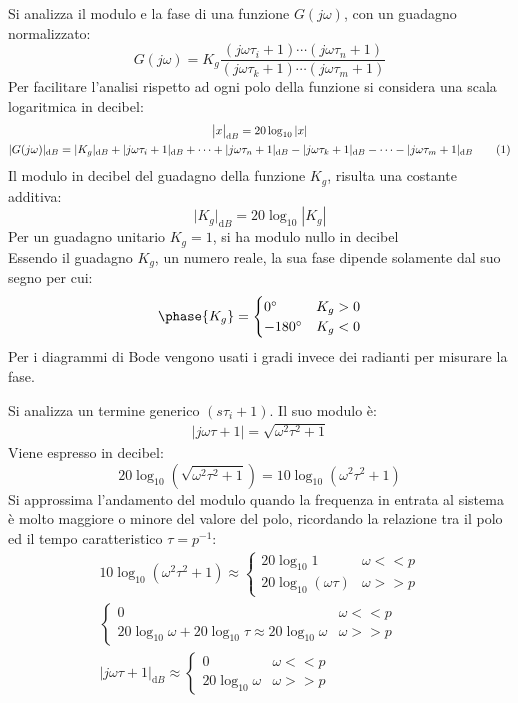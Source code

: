 \documentclass{article}
\numberwithin{equation}{subsection}
\newcommand{\df}{\mathrm{d}}
\newcommand{\tageq}{\tag{\stepcounter{equation}\theequation}}
\begin{document}
Si analizza il modulo e la fase di una funzione $G(j\omega)$, con un guadagno normalizzato:
\begin{equation*}
    G(j\omega)=K_g\displaystyle\frac{(j\omega\tau_i+1)\cdots(j\omega\tau_n+1)}{(j\omega\tau_k+1)\cdots(j\omega\tau_m+1)}
\end{equation*}
Per facilitare l'analisi rispetto ad ogni polo della funzione si considera una scala logaritmica in decibel:
\begin{gather*}
    \big|x\big|_{\df B}=20\log_{10}|x|\\
    |G(j\omega)|_{\df B}=|K_g|_{\df B}+|j\omega\tau_i+1|_{\df B}+\cdots+|j\omega\tau_n+1|_{\df B}-|j\omega\tau_k+1|_{\df B}-\cdots-|j\omega\tau_m+1|_{\df B}\tageq
\end{gather*}
Il modulo in decibel del guadagno della funzione $K_g$, risulta una costante additiva:
\begin{equation}
    \big|K_g\big|_{\df B}=20\log_{10}|K_g|
\end{equation}
Per un guadagno unitario $K_g=1$, si ha modulo nullo in decibel
\\
Essendo il guadagno $K_g$, un numero reale, la sua fase dipende solamente dal suo segno per cui: 
\begin{equation}
    \phase{K_g}=
    \begin{cases}
        0^\circ&K_g>0\\
        -180^\circ&K_g<0
    \end{cases}
\end{equation}
Per i diagrammi di Bode vengono usati i gradi invece dei radianti per misurare la fase. 

Si analizza un termine generico $(s\tau_i+1)$. Il suo modulo è:
\begin{gather*}
    |j\omega\tau+1|=\sqrt{\omega^2\tau^2+1}
\end{gather*}
Viene espresso in decibel:
\begin{equation*}
    20\log_{10}\left(\sqrt{\omega^2\tau^2+1}\right)=10\log_{10}(\omega^2\tau^2+1)
\end{equation*}
Si approssima l'andamento del modulo quando la frequenza in entrata al sistema è molto maggiore o minore del valore del polo, ricordando la relazione tra il polo ed il tempo 
caratteristico $\tau=p^{-1}$:
\begin{gather*}
    10\log_{10}(\omega^2\tau^2+1)\approx
    \begin{cases}
        20\log_{10}1&\omega<<p\\
        20\log_{10}(\omega\tau)&\omega >>p
    \end{cases}\\
    \begin{cases}
        0&\omega<<p\\
        20\log_{10}\omega+20\log_{10}\tau\approx20\log_{10}\omega&\omega>>p
    \end{cases}\\
    |j\omega\tau+1|_{\df B}\approx\begin{cases}
        0&\omega<<p\\
        20\log_{10}\omega&\omega>>p
    \end{cases}
\end{gather*}
\end{document}
